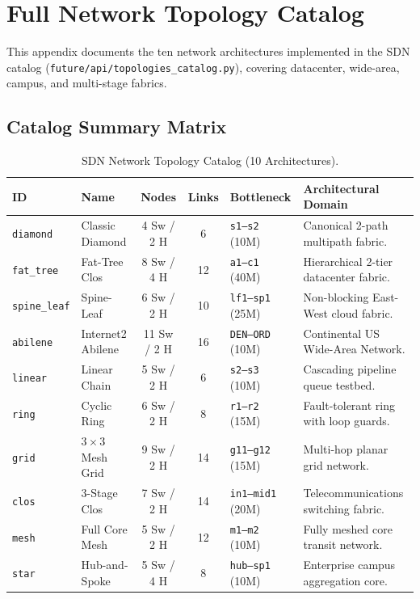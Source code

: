 \chapter{Full Network Topology Catalog}
\label{app:topologies}

This appendix documents the ten network architectures implemented in the SDN catalog (\texttt{future/api/topologies\_catalog.py}), covering datacenter, wide-area, campus, and multi-stage fabrics.

\section{Catalog Summary Matrix}
\begin{table}[H]
  \centering
  \small
  \caption{SDN Network Topology Catalog (10 Architectures).}
  \label{tab:topology_matrix}
  \begin{tabularx}{\textwidth}{l l c c p{2.2cm} X}
    \toprule
    \textbf{ID} & \textbf{Name} & \textbf{Nodes} & \textbf{Links} & \textbf{Bottleneck} & \textbf{Architectural Domain} \\
    \midrule
    \texttt{diamond} & Classic Diamond & 4 Sw / 2 H & 6 & \texttt{s1--s2} (10M) & Canonical 2-path multipath fabric. \\
    \texttt{fat\_tree} & Fat-Tree Clos & 8 Sw / 4 H & 12 & \texttt{a1--c1} (40M) & Hierarchical 2-tier datacenter fabric. \\
    \texttt{spine\_leaf} & Spine-Leaf & 6 Sw / 2 H & 10 & \texttt{lf1--sp1} (25M) & Non-blocking East-West cloud fabric. \\
    \texttt{abilene} & Internet2 Abilene & 11 Sw / 2 H & 16 & \texttt{DEN--ORD} (10M) & Continental US Wide-Area Network. \\
    \texttt{linear} & Linear Chain & 5 Sw / 2 H & 6 & \texttt{s2--s3} (10M) & Cascading pipeline queue testbed. \\
    \texttt{ring} & Cyclic Ring & 6 Sw / 2 H & 8 & \texttt{r1--r2} (15M) & Fault-tolerant ring with loop guards. \\
    \texttt{grid} & $3 \times 3$ Mesh Grid & 9 Sw / 2 H & 14 & \texttt{g11--g12} (15M) & Multi-hop planar grid network. \\
    \texttt{clos} & 3-Stage Clos & 7 Sw / 2 H & 14 & \texttt{in1--mid1} (20M) & Telecommunications switching fabric. \\
    \texttt{mesh} & Full Core Mesh & 5 Sw / 2 H & 12 & \texttt{m1--m2} (10M) & Fully meshed core transit network. \\
    \texttt{star} & Hub-and-Spoke & 5 Sw / 4 H & 8 & \texttt{hub--sp1} (10M) & Enterprise campus aggregation core. \\
    \bottomrule
  \end{tabularx}
\end{table}

